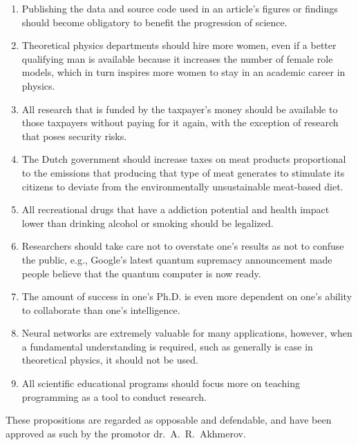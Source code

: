 \documentclass{dissertation}
\begin{document}
\begin{enumerate}
\item Publishing the data and source code used in an article's figures or findings should become obligatory to benefit the progression of science.

\item Theoretical physics departments should hire more women, even if a better qualifying man is available because it increases the number of female role models, which in turn inspires more women to stay in an academic career in physics.

\item All research that is funded by the taxpayer's money should be available to those taxpayers without paying for it again, with the exception of research that poses security risks.

\item The Dutch government should increase taxes on meat products proportional to the emissions that producing that type of meat generates to stimulate its citizens to deviate from the environmentally unsustainable meat-based diet.

\item All recreational drugs that have a addiction potential and health impact lower than drinking alcohol or smoking should be legalized.

\item Researchers should take care not to overstate one's results as not to confuse the public, e.g., Google's latest quantum supremacy announcement made people believe that the quantum computer is now ready.

\item The amount of success in one's Ph.D. is even more dependent on one's ability to collaborate than one's intelligence.

\item Neural networks are extremely valuable for many applications, however, when a fundamental understanding is required, such as generally is case in theoretical physics, it should not be used.

\item All scientific educational programs should focus more on teaching programming as a tool to conduct research.

\end{enumerate}

\bigskip
\bigskip

\begin{center}
These propositions are regarded as opposable and defendable, and have been approved as such by the promotor  dr.\ A.\ R.\ Akhmerov.
\end{center}
\end{document}
